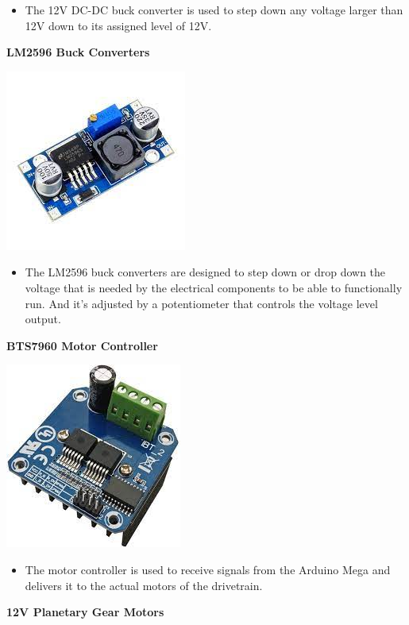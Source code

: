 \documentclass[a4paper, 10pt]{article}
\begin{document}
\begin{itemize}
\item
	The 12V DC-DC buck converter is used to step down any voltage larger than 12V down to its assigned level of 12V.
\end{itemize}


\textbf{LM2596 Buck Converters}

\includegraphics[scale=0.5]{Photos/LM2596 bucks}

\begin{itemize}
\item
	The LM2596 buck converters are designed to step down or drop down the voltage that is needed by the electrical components to be able to functionally run. And it's adjusted by a potentiometer that controls the voltage level output.
\end{itemize}


\textbf{BTS7960 Motor Controller}

\includegraphics[scale=0.5]{Photos/BTS7960 Motor Driver}

\begin{itemize}
\item
	The motor controller is used to receive signals from the Arduino Mega and delivers it to the actual motors of the drivetrain.
\end{itemize}

\textbf{12V Planetary Gear Motors}
\end{document}
